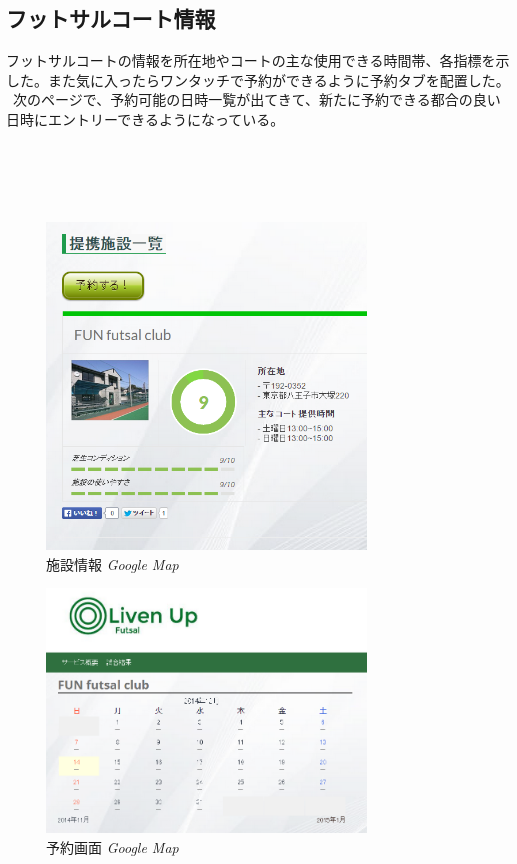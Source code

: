 \subsection{フットサルコート情報}
フットサルコートの情報を所在地やコートの主な使用できる時間帯、各指標を示した。また気に入ったらワンタッチで予約ができるように予約タブを配置した。
\ 次のページで、予約可能の日時一覧が出てきて、新たに予約できる都合の良い日時にエントリーできるようになっている。
\\
\\
\\
\\
\\
\begin{figure}[htbp]
	\centering
	\includegraphics[width=85mm, bb=0 0 300 300]{figures/book.jpg}
	\caption{施設情報 {\itshape Google Map}}
	\label{施設情報}
\end{figure}
\newpage
\begin{figure}[htbp]
	\centering
	\includegraphics[width=85mm, bb=0 0 400 300]{figures/date.jpg}
	\caption{予約画面 {\itshape Google Map}}
	\label{予約画面}
\end{figure}
\newpage



